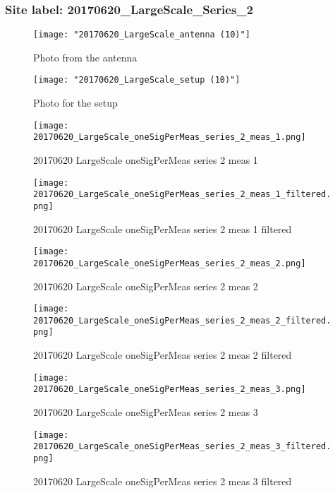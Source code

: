 \subsubsection{Site label: 20170620\_LargeScale\_Series\_2}
\begin{figure}[ht] \caption{Photo from the antenna}
\texttt{[image: "20170620\_LargeScale\_antenna (10)"]}\centering\end{figure}
\begin{figure}[ht] \caption{Photo for the setup}
\texttt{[image: "20170620\_LargeScale\_setup (10)"]}\centering\end{figure}
\begin{figure}[ht] \caption{20170620 LargeScale oneSigPerMeas series 2 meas 1}
\texttt{[image: 20170620\_LargeScale\_oneSigPerMeas\_series\_2\_meas\_1.png]}\centering\end{figure}
\begin{figure}[ht] \caption{20170620 LargeScale oneSigPerMeas series 2 meas 1 filtered}
\texttt{[image: 20170620\_LargeScale\_oneSigPerMeas\_series\_2\_meas\_1\_filtered.png]}\centering\end{figure}
\begin{figure}[ht] \caption{20170620 LargeScale oneSigPerMeas series 2 meas 2}
\texttt{[image: 20170620\_LargeScale\_oneSigPerMeas\_series\_2\_meas\_2.png]}\centering\end{figure}
\begin{figure}[ht] \caption{20170620 LargeScale oneSigPerMeas series 2 meas 2 filtered}
\texttt{[image: 20170620\_LargeScale\_oneSigPerMeas\_series\_2\_meas\_2\_filtered.png]}\centering\end{figure}
\begin{figure}[ht] \caption{20170620 LargeScale oneSigPerMeas series 2 meas 3}
\texttt{[image: 20170620\_LargeScale\_oneSigPerMeas\_series\_2\_meas\_3.png]}\centering\end{figure}
\begin{figure}[ht] \caption{20170620 LargeScale oneSigPerMeas series 2 meas 3 filtered}
\texttt{[image: 20170620\_LargeScale\_oneSigPerMeas\_series\_2\_meas\_3\_filtered.png]}\centering\end{figure}
\clearpage
